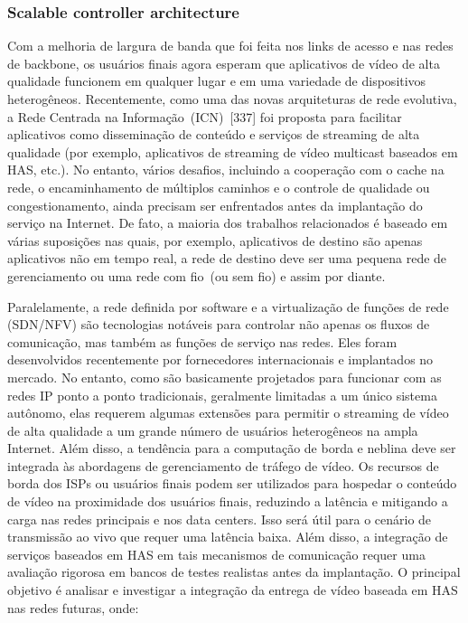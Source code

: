 \subsubsection{Scalable controller architecture}
\label{subsec:sca}

Com a melhoria de largura de banda que foi feita nos links de acesso e nas redes de backbone, os usuários finais agora esperam que aplicativos de vídeo de alta qualidade funcionem em qualquer lugar e em uma variedade de dispositivos heterogêneos. Recentemente, como uma das novas arquiteturas de rede evolutiva, a Rede Centrada na Informação~(ICN)~[337] foi proposta para facilitar aplicativos como disseminação de conteúdo e serviços de streaming de alta qualidade (por exemplo, aplicativos de streaming de vídeo multicast baseados em HAS, etc.). No entanto, vários desafios, incluindo a cooperação com o cache na rede, o encaminhamento de múltiplos caminhos e o controle de qualidade ou congestionamento, ainda precisam ser enfrentados antes da implantação do serviço na Internet. De fato, a maioria dos trabalhos relacionados é baseado em várias suposições nas quais, por exemplo, aplicativos de destino são apenas aplicativos não em tempo real, a rede de destino deve ser uma pequena rede de gerenciamento ou uma rede com fio~(ou sem fio) e assim por diante. 

Paralelamente, a rede definida por software e a virtualização de funções de rede (SDN/NFV) são tecnologias notáveis para controlar não apenas os fluxos de comunicação, mas também as funções de serviço nas redes. Eles foram desenvolvidos recentemente por fornecedores internacionais e implantados no mercado. No entanto, como são basicamente projetados para funcionar com as redes IP ponto a ponto tradicionais, geralmente limitadas a um único sistema autônomo, elas requerem algumas extensões para permitir o streaming de vídeo de alta qualidade a um grande número de usuários heterogêneos na ampla Internet. 
Além disso, a tendência para a computação de borda e neblina deve ser integrada às abordagens de gerenciamento de tráfego de vídeo. Os recursos de borda dos ISPs ou usuários finais podem ser utilizados para hospedar o conteúdo de vídeo na proximidade dos usuários finais, reduzindo a latência e mitigando a carga nas redes principais e nos data centers. Isso será útil para o cenário de transmissão ao vivo que requer uma latência baixa. Além disso, a integração de serviços baseados em HAS em tais mecanismos de comunicação requer uma avaliação rigorosa em bancos de testes realistas antes da implantação. O principal objetivo é analisar e investigar a integração da entrega de vídeo baseada em HAS nas redes futuras, onde:

